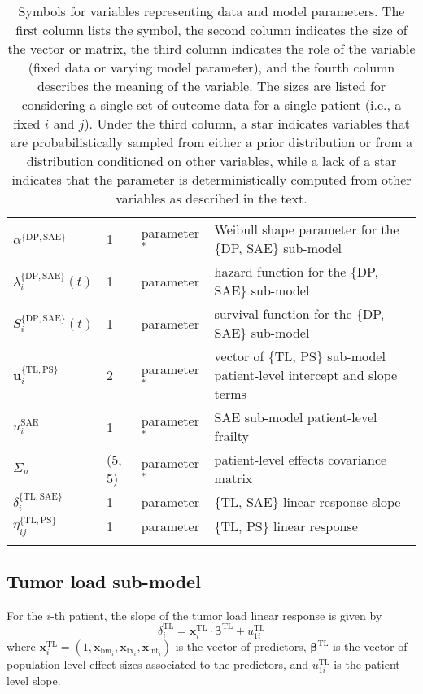 \documentclass[twocolumn]{bmcart}%
\def\v#1{\bm{#1}}
\newcommand{\tl}{\ensuremath{\text{TL}}}
\newcommand{\ps}{\ensuremath{\text{PS}}}
\newcommand{\sae}{\ensuremath{\text{SAE}}}
\newcommand{\prog}{\ensuremath{\text{DP}}}
\begin{document}
\begin{table*}
\begin{tabular}{llll}
    $\alpha^{\{\prog, \sae\}}$ & 1 & parameter$^*$ & Weibull shape parameter for the \{DP, SAE\} sub-model \\[2pt]
    $\lambda_i^{\{\prog, \sae\}}(t)$ & 1 & parameter & hazard function for the \{DP, SAE\} sub-model \\[2pt]
    $S_i^{\{\prog, \sae\}}(t)$ & 1 & parameter & survival function for the \{DP, SAE\} sub-model \\[2pt]

    $\v u_{i}^{\{\tl, \ps\}}$ & 2 & parameter$^*$ & vector of \{TL, PS\} sub-model patient-level intercept and slope terms \\[2pt]
    $u_{i}^\sae$ & 1 & parameter$^*$ & SAE sub-model patient-level frailty \\[2pt]
    $\Sigma_u$ & (5, 5) & parameter$^*$ & patient-level effects covariance matrix \\[2pt]
    $\delta_i^{\{\tl, \sae\}}$ & 1 & parameter & \{TL, SAE\} linear response slope \\[2pt]
    $\eta_{ij}^{\{\tl, \ps\}}$ & 1 & parameter & \{TL, PS\} linear response \\[2pt]                                     
    \bottomrule \\
  \end{tabular}
  \caption{Symbols for variables representing data and model parameters.  The first column lists the symbol, the second column indicates the size of the vector or matrix, the third column indicates the role of the variable (fixed data or varying model parameter), and the fourth column describes the meaning of the variable.  The sizes are listed for considering a single set of outcome data for a single patient (i.e., a fixed $i$ and $j$).  Under the third column, a star indicates variables that are probabilistically sampled from either a prior distribution or from a distribution conditioned on other variables, while a lack of a star indicates that the parameter is deterministically computed from other variables as described in the text.}
  \label{tab:symbols}
\end{table*}


\subsection{Tumor load sub-model}\label{sec:model-tl}

For the $i$-th patient, the slope of the tumor load linear response is given by
\begin{equation}
  \label{eq:tl_slope}
  \delta_i^\tl = \v x_i^\tl \cdot \v \beta^\tl + u_{1i}^\tl
\end{equation}
where $\v x_i^\tl = (1, \v x_{\text{bm}_i}, \v x_{\text{tx}_i}, \v x_{\text{int}_i})$ is the vector of predictors, $\v \beta^\tl$ is the vector of population-level effect sizes associated to the predictors, and $u_{1i}^\tl$ is the patient-level slope.
\end{document}
